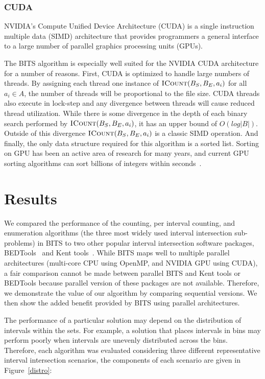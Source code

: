 \documentclass{bioinfo}
\begin{document}
	\subsubsection{CUDA}

	NVIDIA's Compute Unified Device Architecture (CUDA) is a single
	instruction multiple data (SIMD) architecture that provides
	programmers a general interface to a large number of parallel graphics
	processing units (GPUs).

	The BITS algorithm is especially well suited for the NVIDIA CUDA
	architecture for a number of reasons.  First, CUDA is optimized to handle large
	numbers of threads.  By assigning each thread one instance of
	$\textsc{ICount}(B_S,B_E,a_i)$ for all $a_i \in A$, the number of threads will
	be proportional to the file size.  CUDA threads also execute in lock-step and
	any divergence between threads will cause reduced thread utilization.  While
	there is some divergence in the depth of each binary search performed by
	$\textsc{ICount}(B_S,B_E,a_i)$, it has an upper bound of $O(log |B|)$.  Outside of
	this divergence $\textsc{ICount}(B_S,B_E,a_i)$ is a classic SIMD operation.  And
	finally, the only data structure required for this algorithm is a sorted list.
	Sorting on GPU has been an active area of research for many years, and current
	GPU sorting algorithms can sort billions of integers within
	seconds~\citep{merrill2011}.

	\section{Results}

	We compared the performance of the counting, per interval counting, and
	enumeration algorithms (the three most widely used interval intersection
	sub-problems) in BITS to two other popular interval intersection software
	packages, BEDTools~\citep{quinlan2010} and Kent tools~\citep{kent2002}.  While
	BITS maps well to multiple parallel architectures (multi-core CPU using OpenMP,
	and NVIDIA GPU using CUDA), a fair comparison cannot be made between parallel
	BITS and Kent tools or BEDTools because parallel version of these packages are
	not available.  Therefore, we demonstrate the value of our algorithm by
	comparing sequential versions.  We then show the added benefit provided by 
	BITS using parallel architectures.

	The performance of a particular solution may depend on the distribution of
	intervals within the sets.  For example, a solution that places intervals in
	bins may perform poorly when intervals are unevenly distributed across the bins.
	Therefore, each algorithm was evaluated considering three different
	representative interval intersection scenarios, the components of each scenario
	are given in Figure~\ref{distro}:
\end{document}
